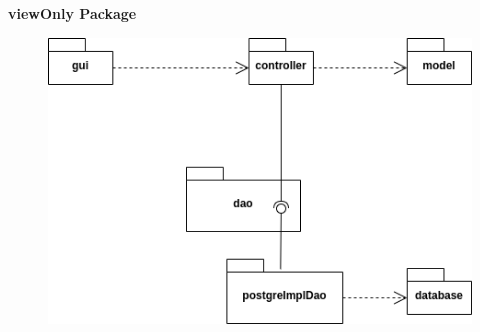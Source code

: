 \begin{figure}[h]
	
\end{figure}

\newpage

\bigskip
\begin{center}
	\textbf{viewOnly Package}
\end{center}
\bigskip

\begin{figure}[h]
	\includegraphics{res/DOC_OBJECT/onlyPackage.png}
\end{figure}






